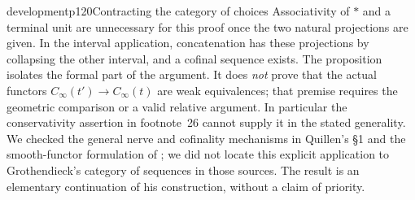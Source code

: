 \begin{dcomment}{development}{p120}{Contracting the category of choices}
Associativity of $*$ and a terminal unit are unnecessary for this proof once the two natural projections are given. In the interval application, concatenation has these projections by collapsing the other interval, and a cofinal sequence exists. The proposition isolates the formal part of the argument. It does \emph{not} prove that the actual functors $C_\infty(t')\to C_\infty(t)$ are weak equivalences; that premise requires the geometric comparison or a valid relative argument. In particular the conservativity assertion in footnote~26 cannot supply it in the stated generality. We checked the general nerve and cofinality mechanisms in Quillen's \S1 and the smooth-functor formulation of \citet[Theorem~1.2]{Maltsiniotis2005Asphericite}; we did not locate this explicit application to Grothendieck's category of sequences in those sources. The result is an elementary continuation of his construction, without a claim of priority.
\end{dcomment}

